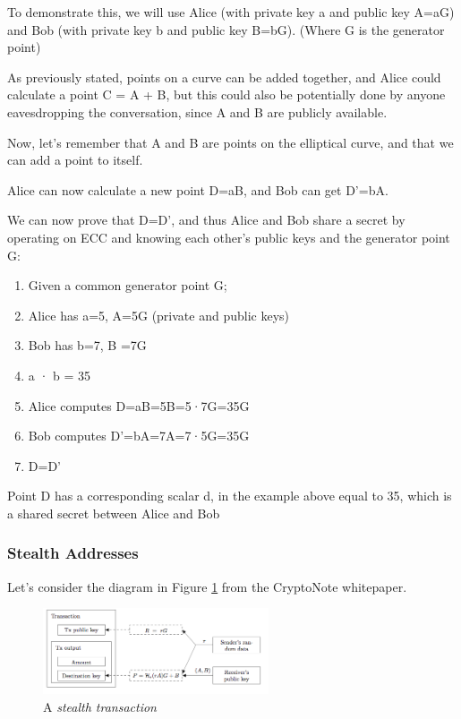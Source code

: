To demonstrate this, we will use Alice (with private key a and public key A=aG) and Bob (with private key b and public key B=bG). (Where G is the generator point)

As previously stated, points on a curve can be added together, and Alice could calculate a point C = A + B, but this could also be potentially done by anyone eavesdropping the conversation, since A and B are publicly available.

Now, let's remember that A and B are points on the elliptical curve, and that we can add a point to itself.

Alice can now calculate a new point D=aB,  and Bob can get D'=bA.

We can now prove that D=D', and thus Alice and Bob share a secret by operating on ECC and knowing each other's public keys and the generator point G:

\begin{enumerate}
\item Given a common generator point G;
\item Alice has a=5, A=5G (private and public keys)
\item Bob has b=7, B =7G
\item a · b = 35
\item Alice computes D=aB=5B=5·7G=35G
\item Bob computes D'=bA=7A=7·5G=35G
\item D=D'
\end{enumerate}

Point D has a corresponding scalar d, in the example above equal to 35, which is a shared secret between Alice and Bob

\subsubsection{Stealth Addresses}

Let's consider the diagram in Figure \ref{fig:cryptodg} from the CryptoNote whitepaper.

\begin{figure}
\includegraphics[height=1in]{M42G4Fy}
\caption{A \textit{stealth transaction}}
\label{fig:cryptodg}
\end{figure}

